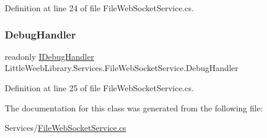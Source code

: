 Definition at line 24 of file File\+Web\+Socket\+Service.\+cs.

\mbox{\label{class_little_weeb_library_1_1_services_1_1_file_web_socket_service_a972c8d4e2c4c18fc0692b374a5dc0755}} 
\subsubsection{\texorpdfstring{Debug\+Handler}{DebugHandler}}
{\footnotesize\ttfamily readonly \mbox{\hyperlink{interface_little_weeb_library_1_1_handlers_1_1_i_debug_handler}{I\+Debug\+Handler}} Little\+Weeb\+Library.\+Services.\+File\+Web\+Socket\+Service.\+Debug\+Handler\hspace{0.3cm}{\ttfamily [private]}}



Definition at line 25 of file File\+Web\+Socket\+Service.\+cs.



The documentation for this class was generated from the following file\+:\begin{DoxyCompactItemize}
\item 
Services/\mbox{\hyperlink{_file_web_socket_service_8cs}{File\+Web\+Socket\+Service.\+cs}}\end{DoxyCompactItemize}
